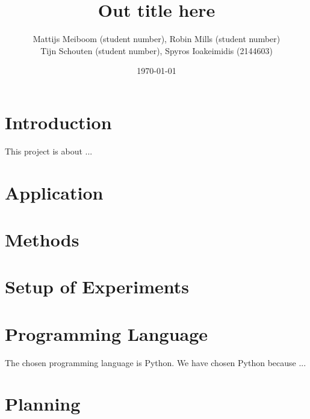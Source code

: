 \documentclass[a4paper, 11pt]{scrartcl}
\title{\Large Out title here}
\author{\small Mattijs Meiboom (student number), Robin Mills (student number)\\
			\small Tijn Schouten (student number), Spyros Ioakeimidis (2144603)}
\date{\small \today}
\begin{document}
\maketitle

\thispagestyle{empty}

\section{Introduction}

This project is about ...

\section{Application}

\section{Methods}

\section{Setup of Experiments}

\section{Programming Language}

The chosen programming language is Python. We have chosen Python because ...

\section{Planning}
\end{document}
